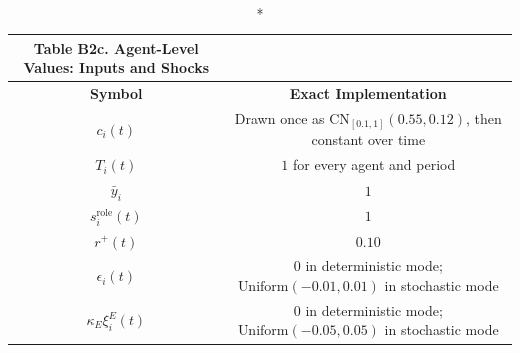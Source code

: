 \documentclass[11pt]{article}
\begin{document}
\endgroup
\begingroup
\small
\setlength{\tabcolsep}{3pt}
\renewcommand{\arraystretch}{1.08}
\begin{longtable}[c]{|c|c|}
    \caption*{Table B2c. Agent-Level Values: Inputs and Shocks}
    \\
    \hline
    \textbf{Symbol} & \textbf{Exact Implementation} \\ \hline
    \endhead
         \hline
         $c_i(t)$&  Drawn once as $\text{CN}_{[0.1,1]}(0.55,0.12)$, then constant over time\\
         \hline
         $T_i(t)$&  $1$ for every agent and period\\
         \hline
         $\bar{y}_i$&  $1$\\
         \hline
         $s_i^{\text{role}}(t)$&  $1$\\
         \hline
         $r^+(t)$&  $0.10$\\
         \hline
         $\epsilon_i(t)$&  \makecell{$0$ in deterministic mode;\\$\text{Uniform}(-0.01,0.01)$ in stochastic mode}\\
         \hline
         $\kappa_E\xi_i^E(t)$&  \makecell{$0$ in deterministic mode;\\$\text{Uniform}(-0.05,0.05)$ in stochastic mode}\\
         \hline
\end{longtable}
\endgroup
\begingroup
\small
\setlength{\tabcolsep}{3pt}
\renewcommand{\arraystretch}{1.08}
\end{document}
